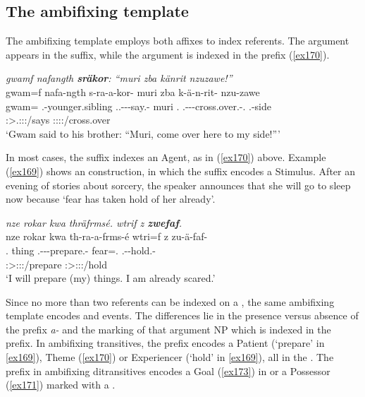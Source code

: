 \subsection{The ambifixing template} \label{ambifixingtemp}

The ambifixing template employs both affixes to index referents. The  argument appears in the suffix, while the  argument is indexed in the prefix (\ref{ex170}).

\begin{exe}
	\ex \emph{gwamf nafangth \textbf{sräkor}: ``muri zba känrit nzuzawe!''}\\
	\glll gwam=f nafa-ngth s-ra-a-kor-\Zero{} muri zba k-ä-n-rit-\Zero{} nzu-zawe\\
	gwam=\Erg{} \Third.\Poss-younger.sibling \Tsg.\Masc.\Bet-\Irr-\Ndu-say.\Rs-\Stsg{} muri \Prox.\Abl{} \M.\Bet-\Ndu-\Venit-cross.over.\Rs-\Ssg.\Imp{} \Fsg.\Poss-side\\
	{} {} \footnotesize{\Stsg:\Sbj>\Tsg.\Masc:\Obj:\Irr:\Pfv/says} {} {} \footnotesize{\Ssg:\Sbj:\Imp:\Pfv:\Venit/cross.over} {}\\
	\trans `Gwam said to his brother: ``Muri, come over here to my side!'''\\ 
	\label{ex170}
\end{exe}

In most cases, the suffix indexes an Agent, as in (\ref{ex170}) above. Example (\ref{ex169}) shows an  construction, in which the suffix encodes a Stimulus. After an evening of stories about sorcery, the speaker announces that she will go to sleep now because `fear has taken hold of her already'.

\begin{exe}
	\ex \emph{nze rokar kwa thräfrmsé. wtrif z \textbf{zwefaf}.}\\
	\glll nze rokar kwa th-ra-a-frms-é wtri=f z zu-ä-faf-\Zero\\
	\Fsg.\Erg{} thing \Fut{} \Stnsg.\Bet-\Irr-\Vc\textbar\Ndu-prepare.\Rs-\Fsg{} fear=\Erg.\Sg{} \Iam{} \Fsg.\Gam-\Ndu-hold.\Rs-\Stsg{}\\
	{} {} {} \footnotesize{\Fsg:\Sbj>\Stpl:\Obj:\Irr:\Pfv/prepare} {} {} \footnotesize{\Stsg:\Sbj>\Fsg:\Obj:\Rpst:\Pfv/hold}\\
	\trans `I will prepare (my) things. I am already scared.' 
	\label{ex169}
\end{exe}

Since no more than two referents can be indexed on a , the same ambifixing template encodes  and  events. The differences lie in the presence versus absence of the  prefix \emph{a-} and the  marking of that argument NP which is indexed in the prefix. In ambifixing transitives, the prefix encodes a Patient (`prepare' in \ref{ex169}), Theme (\ref{ex170}) or Experiencer (`hold' in \ref{ex169}), all in the . The prefix in ambifixing ditransitives encodes a Goal (\ref{ex173}) in   or a Possessor (\ref{ex171}) marked with a .

